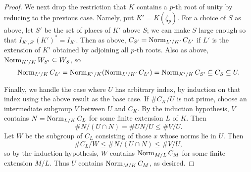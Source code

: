 \begin{proof}
We next drop the restriction that $K$ contains a $p$-th root of unity
by reducing to the previous case. Namely, put $K' = K(\zeta_p)$.
For a choice of $S$ as above, let $S'$ be the set of places of $K'$ above $S$;
we can make $S$ large enough so that $I_{K',S'} (K')^* = I_{K'}$.
Then as above, $C_{S'} = \operatorname{Norm}_{L'/K'} C_{L'}$ if $L'$ is the extension of
$K'$ obtained by adjoining all $p$-th roots. Also as above,
$\operatorname{Norm}_{K'/K} W_{S'} \subseteq W_S$, so
\[
\operatorname{Norm}_{L'/K} C_{L'} = \operatorname{Norm}_{K'/K} (\operatorname{Norm}_{L'/K'} C_{L'})
= \operatorname{Norm}_{K'/K} C_{S'} \subseteq C_S \subseteq U.
\]

Finally, we handle the case where $U$ has arbitrary index, by induction
on that index using the above result as the base case. If $\#C_K/U$
is not prime, choose an intermediate subgroup $V$ between $U$ and $C_K$.
By the induction hypothesis, $V$ contains $N = \operatorname{Norm}_{L/K} C_L$ for some 
finite extension $L$ of $K$. Then 
\[
\#N / (U \cap N) =
\#UN / U \leq \#V/U.
\]
Let $W$ be the subgroup of $C_L$ consisting of those
$x$ whose norms lie in $U$. Then
\[
\#C_L/W \leq \# N/(U \cap N) \leq \#V/U,
\]
so by the induction hypothesis, $W$ contains $\operatorname{Norm}_{M/L} C_M$ for some
finite extension $M/L$. Thus $U$ contains $\operatorname{Norm}_{M/K} C_M$, as desired.  
\end{proof}

%
